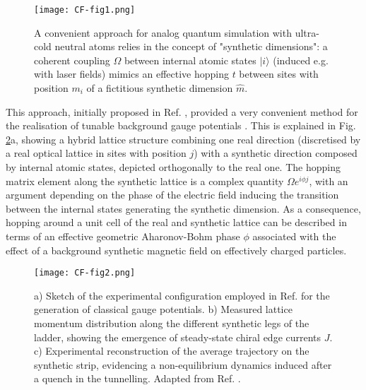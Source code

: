 \documentclass[epj,final]{svjour}
\begin{document}
\begin{figure}
\begin{center}
\texttt{[image: CF-fig1.png]}
\end{center}
\caption{A convenient approach for analog quantum simulation with ultra-cold neutral atoms relies in the concept of "synthetic dimensions": a coherent coupling $\Omega$ between internal atomic states $|i\rangle$ (induced e.g. with laser fields) mimics an effective hopping $t$ between sites with position $m_i$ of a fictitious synthetic dimension $\hat{m}$.}
\label{fig-cf-1}
\end{figure}

This approach, initially proposed in Ref. \cite{boada2012quantumsimulation}, provided a very convenient method for the realisation of tunable background gauge potentials \cite{celi2014syntheticgauge}. This is explained in Fig. \ref{fig-cf-2}a, showing a hybrid lattice structure combining one real direction (discretised by a real optical lattice in sites with position $j$) with a synthetic direction composed by internal atomic states, depicted orthogonally to the real one. The hopping matrix element along the synthetic lattice is a complex quantity $\Omega e^{i \phi j}$, with an argument depending on the phase of the electric field inducing the transition between the internal states generating the synthetic dimension. As a consequence, hopping around a unit cell of the real and synthetic lattice can be described in terms of an effective geometric Aharonov-Bohm phase $\phi$ associated with the effect of a background synthetic magnetic field on effectively charged particles. 

\begin{figure}
\texttt{[image: CF-fig2.png]}
\caption{a) Sketch of the experimental configuration employed in Ref. \cite{mancini2015observation} for the generation of classical gauge potentials. b) Measured lattice momentum distribution along the different synthetic legs of the ladder, showing the emergence of steady-state chiral edge currents $J$. c) Experimental reconstruction of the average trajectory on the synthetic strip, evidencing a non-equilibrium dynamics induced after a quench in the tunnelling. Adapted from Ref. \cite{mancini2015observation}.}
\label{fig-cf-2}
\end{figure}
\end{document}
